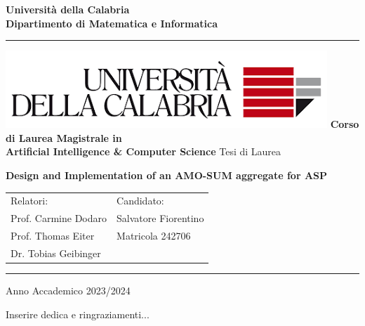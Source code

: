 \documentclass[a4paper,12pt,oneside]{book}
\newenvironment{dedication}
  {\clearpage           %
   \thispagestyle{empty}%
   \vspace*{\stretch{1}}%
   \itshape             %
   \raggedleft          %
  }
   {\par %
   \vspace{\stretch{3}} %
   \clearpage           %
  }
\begin{document}
\begin{titlepage}
\begin{center}
\textbf{\LARGE Universit\`a della Calabria}\\
\textbf{Dipartimento di Matematica e Informatica}\\
\vskip 6pt
\hrule
\vskip 8pt
\includegraphics{logo.png}
\vskip 8pt
\textbf{Corso di Laurea Magistrale in\\ Artificial Intelligence \& Computer Science}
\vskip 32pt
Tesi di Laurea

\vskip 70pt
{ \huge \bfseries Design and Implementation of an AMO-SUM aggregate for ASP}\\[0.4cm]
\vskip 120pt

\begin{tabular}{p{8cm}p{8cm}}
Relatori: & Candidato:\\
Prof. Carmine Dodaro & Salvatore Fiorentino\\
Prof. Thomas Eiter & Matricola 242706\\
Dr. Tobias Geibinger & 
\end{tabular}

\vskip 60pt
\hrule
\vskip 6pt
Anno Accademico 2023/2024
\vfill
\end{center}
\end{titlepage}


\begin{dedication}
Inserire dedica e ringraziamenti...
\end{dedication}




\tableofcontents









\newpage
\printbibliography
\end{document}
